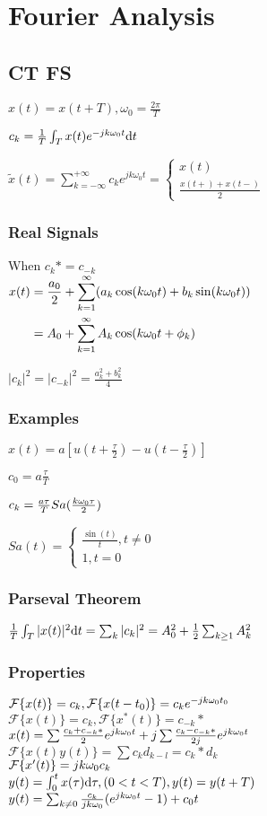 \section{Fourier Analysis}
\subsection*{CT FS}
$x(t)=x(t+T), \omega_0=\frac{2\pi}{T}$

$c_k=\frac 1 T \int_T x(t) e^{-jk\omega_0 t} \mathrm{d} t$

$\tilde{x}(t)=\sum_{k=-\infty}^{+\infty} c_k e^{jk\omega_0 t}=\begin{cases}x(t)\\ \frac{x(t+)+x(t-)}2\end{cases}$
\subsubsection*{Real Signals}
When $c_k*=c_{-k}$\\
$\begin{aligned}
x(t)&=\frac{a_0}{2} + \sum_{k=1}^{\infty} (a_k \cos(k\omega_0t)+b_k\sin(k \omega_0 t)) \\
&=A_0+\sum_{k=1}^{\infty} A_k\cos(k\omega_0 t+\phi_k)
\end{aligned}$

$|c_k|^2=|c_{-k}|^2=\frac{a_k^2+b_k^2}{4}$

\subsubsection*{Examples}
$x(t)=a[u(t+\frac\tau 2) - u(t-\frac\tau 2)]$

$c_0=a\frac\tau T$

$c_k=\frac{a\tau}{T} Sa(\frac{k\omega_0\tau}{2})$

$Sa(t)=\begin{cases}\frac{\sin(t)}{t}, t\ne 0\\1, t=0\end{cases}$

\subsubsection*{Parseval Theorem}

$\frac  1 T \int_T |x(t)|^2\mathrm{d} t = \sum_k |c_k|^2=A_0^2+\frac 1 2\sum_{k\ge 1} A_k^2$

\subsubsection*{Properties}
$\mathcal{F}\{x(t)\}=c_k,\mathcal{F}\{x(t-t_0)\}=c_ke^{-jk\omega_0 t_0}$\\
$\mathcal{F}\{x(t)\}=c_k,\mathcal{F}\{x^*(t)\}=c_{-k}*$\\
$x(t)= \sum \frac{c_k+c_{-k}*}{2}e^{jk\omega_0t} + j \sum \frac{c_k-c_{-k}*}{2j}e^{jk\omega_0t}$ \\
$\mathcal{F}\{x(t)y(t)\}=\sum c_kd_{k-l}=c_k*d_k$\\
$\mathcal{F}\{x'(t)\}=jk\omega_0c_k$\\
$y(t)=\int_0^{t}x(\tau)\mathrm{d} \tau, (0<t<T), y(t)=y(t+T)$\\$y(t)=\sum_{k\ne 0} \frac{c_k}{jk\omega_0}(e^{jk\omega_0 t} - 1) + c_0t$

